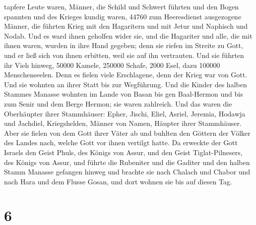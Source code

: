 tapfere Leute waren, Männer, die Schild und Schwert führten und den
Bogen spannten und des Krieges kundig waren, 44760 zum Heeresdienst
ausgezogene Männer,  die führten Krieg mit den Hagaritern
und mit Jetur und Naphisch und Nodab.  Und es ward ihnen
geholfen wider sie, und die Hagariter und alle, die mit ihnen waren,
wurden in ihre Hand gegeben; denn sie riefen im Streite zu Gott, und er
ließ sich von ihnen erbitten, weil sie auf ihn vertrauten.
 Und sie führten ihr Vieh hinweg, 50000 Kamele, 250000
Schafe, 2000 Esel, dazu 100000 Menschenseelen.  Denn es
fielen viele Erschlagene, denn der Krieg war von Gott. Und sie wohnten
an ihrer Statt bis zur Wegführung.  Und die Kinder des
halben Stammes Manasse wohnten im Lande von Basan bis gen Baal-Hermon
und bis zum Senir und dem Berge Hermon; sie waren zahlreich.
 Und das waren die Oberhäupter ihrer Stammhäuser: Epher,
Jischi, Eliel, Asriel, Jeremia, Hodawja und Jachdiel, Kriegshelden,
Männer von Namen, Häupter ihrer Stammhäuser.  Aber sie
fielen von dem Gott ihrer Väter ab und buhlten den Göttern der Völker
des Landes nach, welche Gott vor ihnen vertilgt hatte. 
Da erweckte der Gott Israels den Geist Phuls, des Königs von Assur, und
den Geist Tiglat-Pilnesers, des Königs von Assur, und führte die
Rubeniter und die Gaditer und den halben Stamm Manasse gefangen hinweg
und brachte sie nach Chalach und Chabor und nach Hara und dem Flusse
Gosan, und dort wohnen sie bis auf diesen Tag.

\hypertarget{section-5}{%
\section{6}\label{section-5}}

